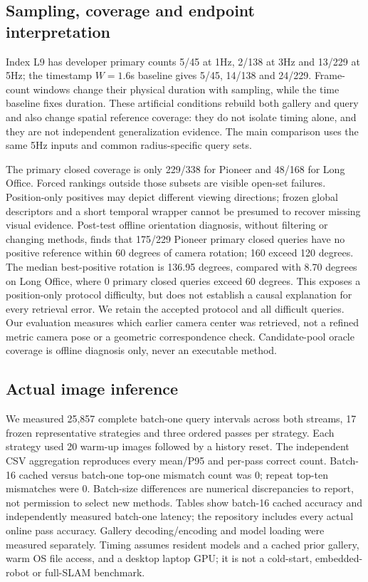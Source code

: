 \documentclass[conference,letterpaper]{IEEEtran}
\begin{document}
\subsection{Sampling, coverage and endpoint interpretation}
Index L9 has developer primary counts 5/45 at 1Hz, 2/138 at 3Hz and 13/229 at 5Hz; the timestamp $W=1.6$s baseline gives 5/45, 14/138 and 24/229. Frame-count windows change their physical duration with sampling, while the time baseline fixes duration. These artificial conditions rebuild both gallery and query and also change spatial reference coverage: they do not isolate timing alone, and they are not independent generalization evidence. The main comparison uses the same 5Hz inputs and common radius-specific query sets.

The primary closed coverage is only 229/338 for Pioneer and 48/168 for Long Office. Forced rankings outside those subsets are visible open-set failures. Position-only positives may depict different viewing directions; frozen global descriptors and a short temporal wrapper cannot be presumed to recover missing visual evidence. Post-test offline orientation diagnosis, without filtering or changing methods, finds that 175/229 Pioneer primary closed queries have no positive reference within 60 degrees of camera rotation; 160 exceed 120 degrees. The median best-positive rotation is 136.95 degrees, compared with 8.70 degrees on Long Office, where 0 primary closed queries exceed 60 degrees. This exposes a position-only protocol difficulty, but does not establish a causal explanation for every retrieval error. We retain the accepted protocol and all difficult queries. Our evaluation measures which earlier camera center was retrieved, not a refined metric camera pose or a geometric correspondence check. Candidate-pool oracle coverage is offline diagnosis only, never an executable method.

\subsection{Actual image inference}
We measured 25,857 complete batch-one query intervals across both streams, 17 frozen representative strategies and three ordered passes per strategy. Each strategy used 20 warm-up images followed by a history reset. The independent CSV aggregation reproduces every mean/P95 and per-pass correct count. Batch-16 cached versus batch-one top-one mismatch count was 0; repeat top-ten mismatches were 0. Batch-size differences are numerical discrepancies to report, not permission to select new methods. Tables show batch-16 cached accuracy and independently measured batch-one latency; the repository includes every actual online pass accuracy. Gallery decoding/encoding and model loading were measured separately. Timing assumes resident models and a cached prior gallery, warm OS file access, and a desktop laptop GPU; it is not a cold-start, embedded-robot or full-SLAM benchmark.
\end{document}
